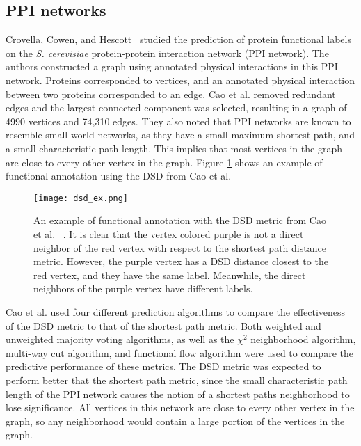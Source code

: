 \subsection{PPI networks} %
Crovella, Cowen, and Hescott~\cite{10.1371/journal.pone.0076339} studied the prediction of protein
functional labels on the \emph{S. cerevisiae} protein-protein interaction network (PPI network). The
authors constructed a graph using annotated physical interactions in this PPI network. Proteins
corresponded to vertices, and an annotated physical interaction between two proteins corresponded to
an edge. Cao et al. removed redundant edges and the largest connected component was selected,
resulting in a graph of 4990 vertices and 74,310 edges. They also noted that PPI networks are known
to resemble small-world networks, as they have a small maximum shortest path, and a small
characteristic path length. This implies that most vertices in the graph are close to every other
vertex in the graph. Figure \ref{fig:PPI_example} shows an example of functional annotation using
the DSD from Cao et al.

\begin{figure}[h] \centering \texttt{[image: dsd\_ex.png]}
\caption{An example of functional annotation with the DSD metric from Cao et al.
~\cite{10.1371/journal.pone.0076339}. It is clear that the vertex colored purple is not a direct
neighbor of the red vertex with respect to the shortest path distance metric. However, the purple
vertex has a DSD distance closest to the red vertex, and they have the same label. Meanwhile, the
direct neighbors of the purple vertex have different labels.}
\label{fig:PPI_example}
\end{figure}

Cao et al. used four different prediction algorithms to compare the effectiveness of the DSD metric
to that of the shortest path metric. Both weighted and unweighted majority voting algorithms, as
well as the $\chi^{2}$ neighborhood algorithm, multi-way cut algorithm, and functional flow
algorithm were used to compare the predictive performance of these metrics. The DSD metric was
expected to perform better that the shortest path metric, since the small characteristic path length
of the PPI network causes the notion of a shortest paths neighborhood to lose significance. All
vertices in this network are close to every other vertex in the graph, so any neighborhood would
contain a large portion of the vertices in the graph.

